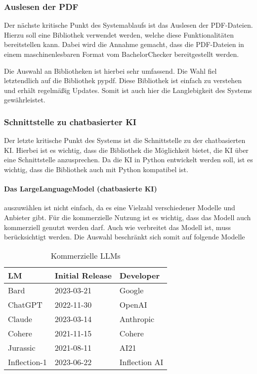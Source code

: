 \subsubsection{Auslesen der PDF}\label{subsubsec:pdf}
Der nächste kritische Punkt des Systemablaufs ist das Auslesen der PDF-Dateien.
Hierzu soll eine Bibliothek verwendet werden, welche diese Funktionalitäten bereitstellen kann.
Dabei wird die Annahme gemacht, dass die PDF-Dateien in einem maschinenlesbaren Format vom BachelorChecker bereitgestellt werden.

Die Auswahl an Bibliotheken ist hierbei sehr umfassend.
Die Wahl fiel letztendlich auf die Bibliothek pypdf.
Diese Bibliothek ist einfach zu verstehen und erhält regelmäßig Updates.
Somit ist auch hier die Langlebigkeit des Systems gewährleistet.

\subsubsection{Schnittstelle zu chatbasierter KI}\label{subsubsec:ki}
Der letzte kritische Punkt des Systems ist die Schnittstelle zu der chatbasierten KI.
Hierbei ist es wichtig, dass die Bibliothek die Möglichkeit bietet, die KI über eine Schnittstelle anzusprechen.
Da die KI in Python entwickelt werden soll, ist es wichtig, dass die Bibliothek auch mit Python kompatibel ist.

\paragraph{Das LargeLanguageModel (chatbasierte KI)} auszuwählen ist nicht einfach,
da es eine Vielzahl verschiedener Modelle und Anbieter gibt.
Für die kommerzielle Nutzung ist es wichtig, dass das Modell auch kommerziell genutzt werden darf.
Auch wie verbreitet das Modell ist, muss berücksichtigt werden.
Die Auswahl beschränkt sich somit auf folgende Modelle

\begin{table}[H]
    \begin{tabularx}{\textwidth}{lll}
        \toprule
        \textbf{LM}  & \textbf{Initial Release} & \textbf{Developer} \\
        \midrule
        Bard         & 2023-03-21               & Google             \\
        ChatGPT      & 2022-11-30               & OpenAI             \\
        Claude       & 2023-03-14               & Anthropic          \\
        Cohere       & 2021-11-15               & Cohere             \\
        Jurassic     & 2021-08-11               & AI21               \\
        Inflection-1 & 2023-06-22               & Inflection AI      \\
        \bottomrule
    \end{tabularx}
    \caption{Kommerzielle LLMs}\autocite{sapling.llmindex}
    \label{tab:kommerzielle-llms}
\end{table}




